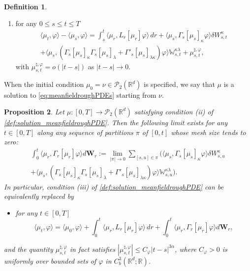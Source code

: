 \documentclass[10pt, a4paper]{article} %
\newcommand{\R}{\mathbb{R}}
\theoremstyle{definition}
\newtheorem{defn}{Definition}[section]
\theoremstyle{plain}
\newtheorem{prop}[defn]{Proposition}
\begin{document}
\begin{defn}
\begin{enumerate}
        \item for any $0 \le s \le t \le T$ \begin{multline*}
            \langle \mu_t, \varphi \rangle - \langle \mu_s, \varphi \rangle = \int_s^t \langle \mu_r, L_r[\mu_r] \varphi \rangle \, dr + \langle \mu_s, \Gamma_s[\mu_s]_\kappa \varphi  \rangle \delta W^\kappa_{s,t}  \\ + \langle \mu_s, (\Gamma_s[\mu_s]_\kappa \Gamma_s[\mu_s]_\lambda + \Gamma'_s[\mu_s]_{\lambda \kappa}) \varphi  \rangle \mathbb{W}^{\kappa\lambda}_{s,t} + \mu_{s,t}^{\natural,\varphi},
        \end{multline*}
        with $\mu_{s,t}^{\natural,\varphi}=o(|t-s|)$ as $|t-s| \to 0$. 
    \end{enumerate}
    When the initial condition $\mu_0 = \nu \in \mathcal{P}_2(\R^d)$ is specified, we say that $\mu$ is a solution to \eqref{eq:meanfieldroughPDEs} starting from $\nu$. 
\end{defn}

\begin{prop}
    Let $\mu : [0,T] \to \mathcal{P}_2(\R^d)$ satisfying condition (ii) of \cref{def:solution_meanfieldroughPDE}.
    Then the following limit exists for any $t \in [0,T]$ along any sequence of partitions $\pi$ of $[0,t]$ whose mesh size tends to zero: 
    \begin{multline*}
        \int_0^t  \langle \mu_r, \Gamma_r[\mu_r] \varphi  \rangle d \mathbf{W}_r := \lim_{|\pi|\to0} \sum_{[s,u]\in \pi} \big(  \langle \mu_s, \Gamma_s[\mu_s]_\kappa \varphi  \rangle \delta W^\kappa_{s,u}  \\ + \langle \mu_s, (\Gamma_s[\mu_s]_\kappa \Gamma_s[\mu_s]_\lambda + \Gamma'_s[\mu_s]_{\lambda \kappa}) \varphi  \rangle \mathbb{W}^{\kappa\lambda}_{s,u} \big).
    \end{multline*}
    In particular, condition (iii) of \cref{def:solution_meanfieldroughPDE} can be equivalently replaced by   \begin{itemize}
    \item[(iii')] for any $t \in [0,T]$ \begin{equation*}
        \langle \mu_t, \varphi \rangle = \langle \mu_0, \varphi \rangle + \int_0^t \langle \mu_r, L_r[\mu_r] \varphi \rangle \, dr + \int_0^t  \langle \mu_r, \Gamma_r[\mu_r] \varphi  \rangle d \mathbf{W}_r ,
    \end{equation*} 
\end{itemize}
and the quantity $\mu_{s,t}^{\natural,\varphi}$ in fact satisfies $|\mu_{s,t}^{\natural,\varphi}| \le C_{\varphi} |t-s|^{3\alpha}$, where $C_\varphi > 0$ 
is uniformly over bounded sets of $\varphi$ in $C^3_b(\R^d;\R)$.
\end{prop} 
\end{document}

